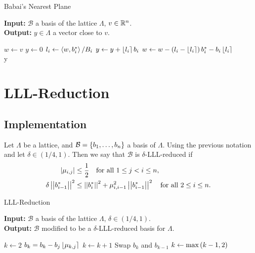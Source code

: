   \begin{algorithm}
    \caption{Babai's Nearest Plane}
    \label{alg:babai-nearest-plane}
    \textbf{Input:} $\mathcal{B}$ a basis of the lattice $\Lambda$, $v \in \mathbb{R}^n$. \\
    \textbf{Output:} $y \in \Lambda$ a vector close to $v$. \\
    \begin{algorithmic}[1]
      \State $w \gets v$
      \State $y \gets 0$
        \State $l_i \gets \left< w, b_i^* \right>/B_i$
        \State $y \gets y + \left\lfloor l_i \right\rceil b_i$
        \State $w \gets w - \left(  l_i - \left\lfloor l_i \right\rceil  \right)b_i^* - b_i \left\lfloor l_i \right\rceil$
      \EndFor \\
      \Return y
    \end{algorithmic}
  \end{algorithm}


\section{LLL-Reduction}

\subsection{Implementation}

  \begin{definition}
    Let $\Lambda$ be a lattice, and $\mathcal{B} = \left\lbrace  b_1, \dots, b_n \right\rbrace$ a basis of $\Lambda$.
    Using the previous notation and let $\delta \in (1/4, 1)$.
    Then we say that $\mathcal{B}$ is $\delta$-LLL-reduced if
    \begin{align}
      \left|  \mu_{i,j}  \right| &\leq \frac{1}{2}  \quad  \text{for all } 1 \leq j < i \leq n,  \\
      \delta \left|\left|  b_{i-1}^*  \right|\right|^2 &\leq \left|\left|  b_i^*  \right|\right|^2 + \mu_{i,i-1}^2 \left|\left|  b_{i-1}^*  \right|\right|^2 \quad \text{for all } 2 \leq i \leq n.
    \end{align}
  \end{definition}

  \begin{algorithm}
    \caption{LLL-Reduction}
    \label{alg:lll-reduction}
    \textbf{Input:} $\mathcal{B}$ a basis of the lattice $\Lambda$, $\delta \in (1/4, 1)$. \\
    \textbf{Output:} $\mathcal{B}$ modified to be a $\delta$-LLL-reduced basis for $\Lambda$. \\
    \begin{algorithmic}[1]
      \State $k \gets 2$
            \State $b_k = b_k - b_j \left\lfloor \mu_{k,j} \right\rceil$
          \EndIf        
        \EndFor
          \State $k \gets k+1$
        \Else
          \State Swap $b_k$ and $b_{k-1}$
          \State $k \gets \operatorname{max} \left(  k-1, 2  \right)$
        \EndIf
      \EndWhile
    \end{algorithmic}
  \end{algorithm}

